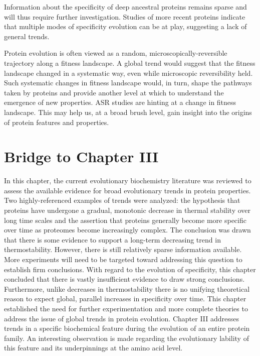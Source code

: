Information about the specificity of deep ancestral proteins remains
sparse and will thus require further investigation. Studies of more
recent proteins indicate that multiple modes of specificity evolution
can be at play, suggesting a lack of general trends.

Protein evolution is often viewed as a random, microscopically-reversible
trajectory along a fitness landscape. A global trend would suggest
that the fitness landscape changed in a systematic way, even while
microscopic reversibility held. Such systematic changes in fitness
landscape would, in turn, shape the pathways taken by proteins and
provide another level at which to understand the emergence of new
properties. ASR studies are hinting at a change in fitness landscape.
This may help us, at a broad brush level, gain insight into the origins
of protein features and properties.

\section{Bridge to Chapter III}

In this chapter, the current evolutionary biochemistry literature
was reviewed to assess the available evidence for broad evolutionary
trends in protein properties. Two highly-referenced examples of trends
were analyzed: the hypothesis that proteins have undergone a gradual,
monotonic decrease in thermal stability over long time scales and
the assertion that proteins generally become more specific over time
as proteomes become increasingly complex. The conclusion was drawn
that there is some evidence to support a long-term decreasing trend
in thermostability. However, there is still relatively sparse information
available. More experiments will need to be targeted toward addressing
this question to establish firm conclusions. With regard to the evolution
of specificity, this chapter concluded that there is vastly insufficient
evidence to draw strong conclusions. Furthermore, unlike decreases
in thermostability there is no unifying theoretical reason to expect
global, parallel increases in specificity over time. This chapter
established the need for further experimentation and more complete
theories to address the issue of global trends in protein evolution.
Chapter III addresses trends in a specific biochemical feature during
the evolution of an entire protein family. An interesting observation
is made regarding the evolutionary lability of this feature and its
underpinnings at the amino acid level. 


